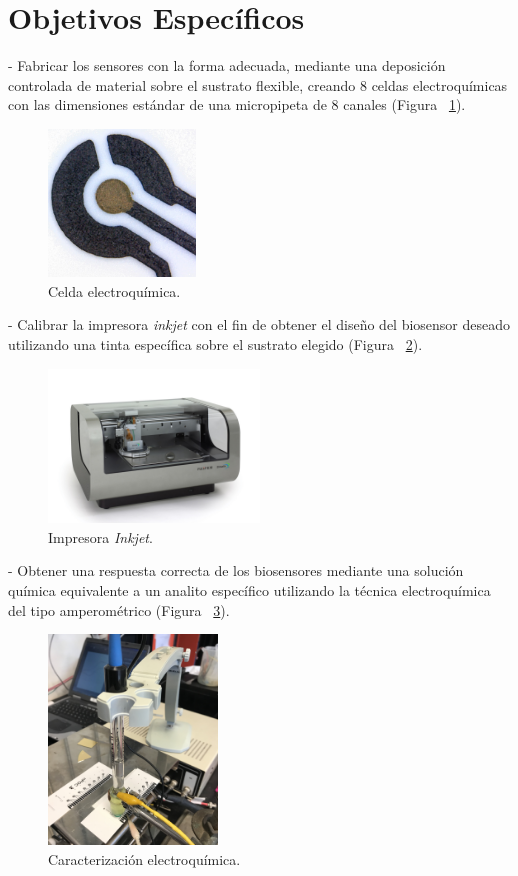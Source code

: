 \section{Objetivos Espec\'ificos}
- Fabricar los sensores con la forma adecuada, mediante una deposición controlada de material sobre el sustrato flexible, creando 8 celdas electroquímicas con las dimensiones estándar de una micropipeta de 8 canales (Figura ~\ref{fig:Figura_celda_electroquimica}).\\
\begin{figure}[H]
  \centering
    \includegraphics[width=0.35\textwidth]{Figuras/Figura_celda_electroquimica}
  \caption{Celda electroquímica.}
  \label{fig:Figura_celda_electroquimica}
\end{figure}
- Calibrar la impresora \textit{inkjet} con el fin de obtener el diseño del biosensor deseado utilizando una tinta específica sobre el sustrato elegido (Figura ~\ref{fig:Figura_impresora_objetivos}).\\
\begin{figure}[H]
  \centering
    \includegraphics[width=0.5\textwidth]{Figuras/Figura_impresora_objetivos}
  \caption{Impresora \textit{Inkjet}.}
  \label{fig:Figura_impresora_objetivos}
\end{figure}
- Obtener una respuesta correcta de los biosensores mediante una solución química equivalente a un analito específico utilizando la técnica electroquímica del tipo amperométrico (Figura ~\ref{fig:Figura_caracElectroquim_objetivos}).\\
\begin{figure}[H]
  \centering
    \includegraphics[width=0.4\textwidth]{Figuras/Figura_caracElectroquim_objetivos}
  \caption{Caracterización electroquímica.}
  \label{fig:Figura_caracElectroquim_objetivos}
\end{figure}